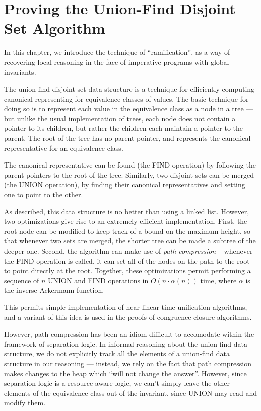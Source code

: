 \chapter{Proving the Union-Find Disjoint Set Algorithm}

In this chapter, we introduce the technique of ``ramification'', as a
way of recovering local reasoning in the face of imperative programs
with global invariants.

The union-find disjoint set data structure is a technique for
efficiently computing canonical representing for equivalence classes
of values. The basic technique for doing so is to represent each value
in the equivalence class as a node in a tree --- but unlike the usual
implementation of trees, each node does not contain a pointer to its
children, but rather the children each maintain a pointer to the
parent. The root of the tree has no parent pointer, and represents the
canonical representative for an equivalence class.

The canonical representative can be found (the FIND operation) by
following the parent pointers to the root of the tree. Similarly, two
disjoint sets can be merged (the UNION operation), by finding their
canonical representatives and setting one to point to the other.

As described, this data structure is no better than using a linked
list. However, two optimizations give rise to an extremely efficient
implementation. First, the root node can be modified to keep track of
a bound on the maximum height, so that whenever two sets are merged,
the shorter tree can be made a subtree of the deeper one. Second, the
algorithm can make use of \emph{path compression} -- whenever the FIND
operation is called, it can set all of the nodes on the path to the
root to point directly at the root. Together, these optimizations
permit performing a sequence of $n$ UNION and FIND operations in $O(n
\cdot \alpha(n))$ time, where $\alpha$ is the inverse Ackermann
function.

This permits simple implementation of near-linear-time unification
algorithms, and a variant of this idea is used in the proofs of
congruence closure algorithms.

However, path compression has been an idiom difficult to accomodate
within the framework of separation logic. In informal reasoning about
the union-find data structure, we do not explicitly track all the
elements of a union-find data structure in our reasoning --- instead,
we rely on the fact that path compression makes changes to the heap
which ``will not change the answer''. However, since separation logic
is a resource-aware logic, we can't simply leave the other elements of
the equivalence class out of the invariant, since UNION may read and
modify them.

